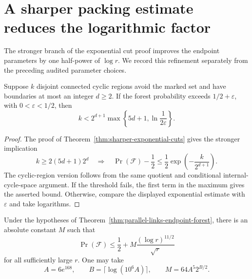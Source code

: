 \section{A sharper packing estimate reduces the logarithmic factor}
\label{sec:parallel-links-log-five-half}

The stronger branch of the exponential cut proof improves the endpoint parameters by one half-power of $\log r$.
We record this refinement separately from the preceding audited parameter choices.

\begin{lemma}
\label{lem:endpoint-sharp-packing}
Suppose $k$ disjoint connected cyclic regions avoid the marked set and have boundaries at most an integer $d\ge2$.
If the forest probability exceeds $1/2+\varepsilon$, with $0<\varepsilon<1/2$, then
\[
 k<2^{d+1}\max\left\{5d+1,\ln\frac1{2\varepsilon}\right\}.
\]
\end{lemma}

\begin{proof}
The proof of Theorem~\ref{thm:sharper-exponential-cuts} gives the stronger implication
\[
 k\ge2(5d+1)2^d
 \quad\Longrightarrow\quad
 \Pr(\mathcal F)-\frac12
 \le\frac12\exp\left(-\frac{k}{2^{d+1}}\right).
\]
The cyclic-region version follows from the same quotient and conditional internal-cycle-space argument.
If the threshold fails, the first term in the maximum gives the asserted bound.
Otherwise, compare the displayed exponential estimate with $\varepsilon$ and take logarithms.
\end{proof}

\begin{theorem}
\label{thm:parallel-links-log-five-half-forest}
Under the hypotheses of Theorem~\ref{thm:parallel-links-endpoint-forest}, there is an absolute constant $M$ such that
\[
 \Pr(\mathcal F)
 \le\frac12+M\frac{(\log r)^{11/2}}{\sqrt r}
\]
for all sufficiently large $r$.
One may take
\[
 A=6e^{168},\qquad B=\lceil\log(10^6A)\rceil,
 \qquad M=64A^5 2^{B/2}.
\]
\end{theorem}

